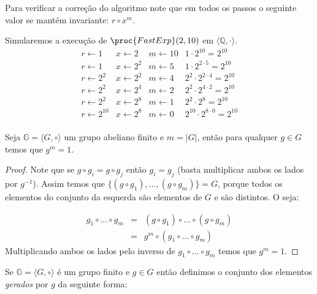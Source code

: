 Para verificar a correção do algoritmo note que em todos os passos o seguinte valor se mantém invariante: $r \circ x^m$.

\begin{example}
  Simularemos a execução de $\proc{FastExp}(2, 10)$ em $\langle \mathbb{Q}, \cdot \rangle$.
\begin{displaymath}
  \begin{array}{lllr}
    r \gets 1 & x \gets 2 & m \gets 10 & 1 \cdot 2^{10} = 2^{10}\\
    r \gets 1 & x \gets 2^2 & m \gets 5 & 1 \cdot 2^{2 \cdot 5} = 2^{10}\\
    r \gets 2^2 & x \gets 2^2 & m \gets 4 & 2^2 \cdot 2^{2 \cdot 4} = 2^{10}\\
    r \gets 2^2 & x \gets 2^4 & m \gets 2 & 2^2 \cdot 2^{4 \cdot 2} = 2^{10}\\
    r \gets 2^2 & x \gets 2^8 & m \gets 1 & 2^2 \cdot 2^8 = 2^{10}\\
    r \gets 2^{10} & x \gets 2^8 & m \gets 0 & 2^{10} \cdot 2^{8 \cdot 0} = 2^{10}\\
  \end{array}
\end{displaymath}
\end{example}


\begin{theorem}
  Seja $\mathbb{G} = \langle G, \circ \rangle$ um grupo abeliano finito e $m = |G|$, então para qualquer $g \in G$ temos que $g^m = 1$.
\end{theorem}
\begin{proof}
  Note que se $g \circ g_i = g \circ g_j$ então $g_i = g_j$ (basta multiplicar ambos os lados por $g^{-1}$).
  Assim temos que $\{(g \circ g_1), \dots, (g \circ g_m)\} = G$, porque todos os elementos do conjunto da esquerda são elementos de $G$ e são distintos.
  O seja:
  
  \begin{eqnarray*}
    g_1 \circ \dots \circ g_m & = & (g \circ g_1) \circ \dots \circ (g \circ g_m)\\
                              & = & g^m \circ (g_1 \circ \dots \circ g_m)
  \end{eqnarray*}
  Multiplicando ambos os lados pelo inverso de $g_1 \circ \dots \circ g_m$ temos que $g^m = 1$.
\end{proof}

Se $\mathbb{G} = \langle G, \circ \rangle$ é um grupo finito e $g \in G$ então definimos o conjunto dos elementos {\em gerados} por $g$ da seguinte forma:

